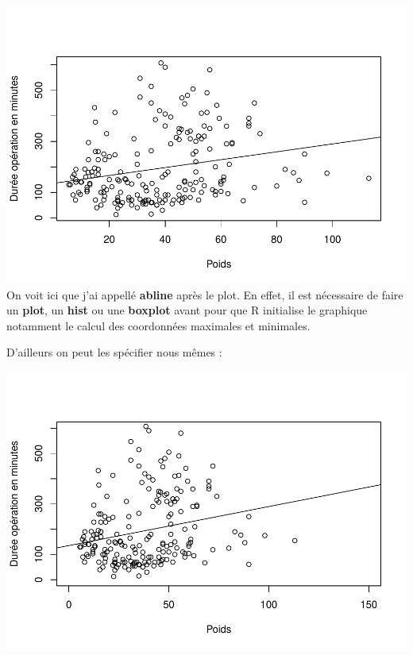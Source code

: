 \documentclass[
]{book}
\newenvironment{Shaded}{\begin{snugshade}}{\end{snugshade}}
\newcommand{\AttributeTok}[1]{\textcolor[rgb]{0.13,0.29,0.53}{#1}}
\newcommand{\DecValTok}[1]{\textcolor[rgb]{0.00,0.00,0.81}{#1}}
\newcommand{\FunctionTok}[1]{\textcolor[rgb]{0.13,0.29,0.53}{\textbf{#1}}}
\newcommand{\NormalTok}[1]{#1}
\newcommand{\OtherTok}[1]{\textcolor[rgb]{0.56,0.35,0.01}{#1}}
\newcommand{\SpecialCharTok}[1]{\textcolor[rgb]{0.81,0.36,0.00}{\textbf{#1}}}
\newcommand{\StringTok}[1]{\textcolor[rgb]{0.31,0.60,0.02}{#1}}
\begin{document}
\includegraphics{_main_files/figure-latex/poids10-1.pdf}
On voit ici que j'ai appellé \textbf{abline} après le plot. En effet, il est nécessaire
de faire un \textbf{plot}, un \textbf{hist} ou une \textbf{boxplot} avant pour que R initialise
le graphique notamment le calcul des coordonnées maximales et minimales.

D'ailleurs on peut les spécifier nous mêmes :

\begin{Shaded}
\end{Shaded}

\includegraphics{_main_files/figure-latex/poids11-1.pdf}
\end{document}

